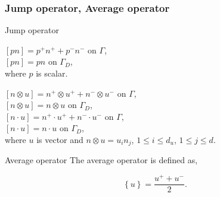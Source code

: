 \documentclass{beamer}
\begin{document}


\begin{frame}
\frametitle{Jump operator, Average operator}

\begin{block}{Jump operator}

\begin{center}
$[pn] = p^+ n^+ + p^- n^- $ on $\Gamma$,\\
$[pn] = p n $ on $\Gamma_D$,\\
where $p$ is scalar.
\end{center}

\begin{center}
$[n \otimes u] = n^+ \otimes u^+ + n^- \otimes u^-$ on $\Gamma$,\\
$[n \otimes u] = n \otimes u$ on $\Gamma_D$,\\
$[n \cdot u] = n^+ \cdot u^+ + n^- \cdot u^-$ on $\Gamma$,\\
$[n \cdot u] = n \cdot u$ on $\Gamma_D$,\\
where $u$ is vector and $n \otimes u = u_i n_j$, $1 \leq i \leq d_u$, $1 \leq j \leq d$.\\ 
\end{center}
\end{block}

\begin{block}{Average operator}
The average operator is defined as,

\begin{equation}\label{average operator}
\left\lbrace u \right\rbrace = \frac{u^+ + u^-}{2} \textrm{.}
\end{equation} 

\end{block}

\end{frame}

\end{document}
